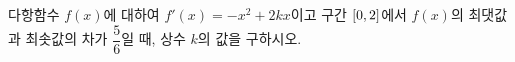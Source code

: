 다항함수 $f(x)$에 대하여 $f'(x)=-x^2+2kx$이고 구간 $[0{,}\mkern3mu\mathopen{}2]$에서 $f(x)$의 최댓값과 최솟값의 차가 $\dfrac{5}{6}$일 때, 상수 $k$의 값을 구하시오. 
